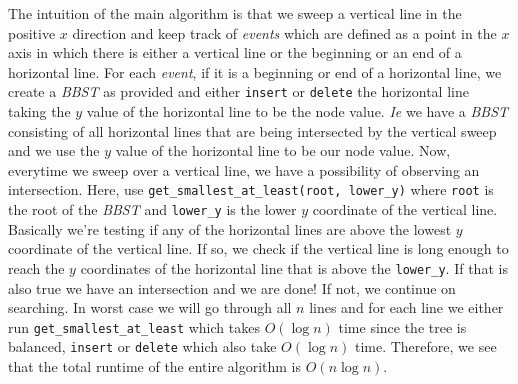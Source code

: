 \documentclass[12pt,twoside]{article}
\begin{document}
\begin{problems}
\begin{problemparts}
The intuition of the main algorithm is that we sweep a vertical line in the positive $x$ direction and keep track of \emph{events} which are defined as a point in the $x$ axis in which there is either a vertical line or the beginning or an end of a horizontal line. For each \emph{event}, if it is a beginning or end of a horizontal line, we create a \emph{BBST} as provided and either {\tt insert} or {\tt delete} the horizontal line taking the $y$ value of the horizontal line to be the node value. \emph{Ie} we have a \emph{BBST} consisting of all horizontal lines that are being intersected by the vertical sweep and we use the $y$ value of the horizontal line to be our node value. Now, everytime we sweep over a vertical line, we have a possibility of observing an intersection. Here, use {\tt get\_smallest\_at\_least(root, lower\_y)} where {\tt root} is the root of the \emph{BBST} and {\tt lower\_y} is the lower $y$ coordinate of the vertical line. Basically we're testing if any of the horizontal lines are above the lowest $y$ coordinate of the vertical line. If so, we check if the vertical line is long enough to reach the $y$ coordinates of the horizontal line that is above the {\tt lower\_y}. If that is also true we have an intersection and we are done! If not, we continue on searching. In worst case we will go through all $n$ lines and for each line we either run {\tt get\_smallest\_at\_least} which takes $O(\log n)$ time since the tree is balanced, {\tt insert} or {\tt delete} which also take $O(\log n)$ time. Therefore, we see that the total runtime of the entire algorithm is $O(n \log n)$. 

\end{problemparts}
\end{problems}
\end{document}
